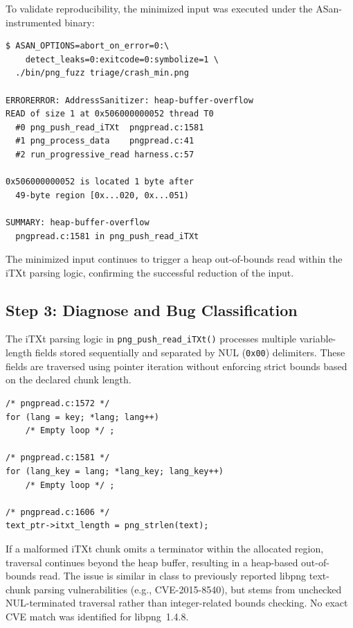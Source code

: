 To validate reproducibility, the minimized input was executed
under the ASan-instrumented binary:

{\scriptsize
\begin{lstlisting}[style=terminal]
$ ASAN_OPTIONS=abort_on_error=0:\
    detect_leaks=0:exitcode=0:symbolize=1 \
  ./bin/png_fuzz triage/crash_min.png

ERRORERROR: AddressSanitizer: heap-buffer-overflow
READ of size 1 at 0x506000000052 thread T0
  #0 png_push_read_iTXt  pngpread.c:1581
  #1 png_process_data    pngpread.c:41
  #2 run_progressive_read harness.c:57

0x506000000052 is located 1 byte after
  49-byte region [0x...020, 0x...051)

SUMMARY: heap-buffer-overflow
  pngpread.c:1581 in png_push_read_iTXt
\end{lstlisting}
}
The minimized input continues to trigger a heap out-of-bounds
read within the iTXt parsing logic, confirming the successful reduction of the input.

\vspace{-0.2cm}
\subsection{Step 3: Diagnose and Bug Classification}

The iTXt parsing logic in \texttt{png\_push\_read\_iTXt()} processes
multiple variable-length fields stored sequentially and separated by
NUL (\texttt{0x00}) delimiters. These fields are traversed using
pointer iteration without enforcing strict bounds based on the
declared chunk length.

{\scriptsize
\begin{lstlisting}[style=terminal]
/* pngpread.c:1572 */
for (lang = key; *lang; lang++)
    /* Empty loop */ ;

/* pngpread.c:1581 */
for (lang_key = lang; *lang_key; lang_key++)
    /* Empty loop */ ;

/* pngpread.c:1606 */
text_ptr->itxt_length = png_strlen(text);
\end{lstlisting}
}

If a malformed iTXt chunk omits a terminator within the allocated
region, traversal continues beyond the heap buffer, resulting in a heap-based out-of-bounds read. The issue is similar in class to previously reported libpng
text-chunk parsing vulnerabilities (e.g., CVE-2015-8540), but stems
from unchecked NUL-terminated traversal rather than integer-related
bounds checking. No exact CVE match was identified for libpng~1.4.8.
